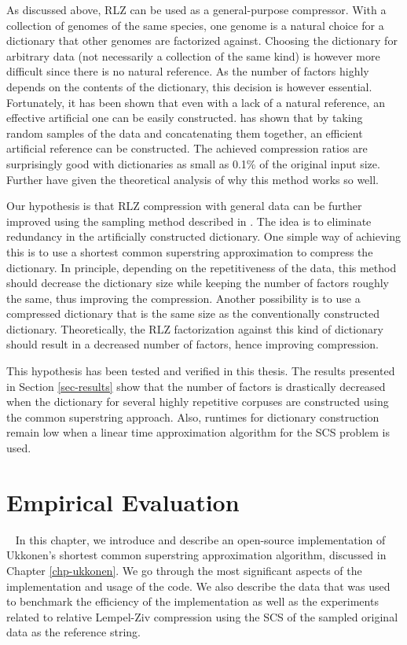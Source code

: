 \documentclass[english,twoside,censored,csm,algorithms-track-2020]{HYthesisML}
\theoremstyle{plain}
\theoremstyle{definition}
\begin{document}
As discussed above, RLZ can be used as a general-purpose compressor. With a collection of
genomes of the same species, one genome is a natural choice for a dictionary that other genomes are
factorized against. Choosing the dictionary for arbitrary data (not necessarily a collection of the
same kind) is however more difficult since there is no natural reference. As the number of factors
highly depends on the contents of the dictionary, this decision is however essential. Fortunately, it has been shown
that even with a lack of a natural reference, an effective artificial one can be easily constructed.
\citep{Hoobin11} has shown that by taking random samples of the data and concatenating them together,
an efficient  artificial reference can be constructed. The achieved compression ratios are surprisingly
good with dictionaries as small as 0.1\% of the original input size. Further \citep{Gagie16} have
given the theoretical analysis of why this method works so well.

Our hypothesis is that RLZ compression with general data can be further improved using the
sampling method described in \citep{Hoobin11}. The idea is to eliminate redundancy in the
artificially constructed dictionary. One simple way of achieving this is to use a shortest common
superstring approximation to compress the dictionary. In principle, depending on the repetitiveness
of the data, this method should decrease the dictionary size while keeping the number of factors
roughly the same, thus improving the compression. Another possibility is to use a compressed
dictionary that is the same size as the conventionally constructed dictionary. Theoretically, the
RLZ factorization against this kind of dictionary should result in a decreased number of factors,
hence improving compression.

This hypothesis has been tested and verified in this thesis. The results presented in Section
\ref{sec-results} show that the number of factors is drastically decreased when the dictionary
for several highly repetitive corpuses are constructed using the common superstring approach.
Also, runtimes for dictionary construction remain low when a linear time approximation
algorithm for the SCS problem is used.

\chapter{Empirical Evaluation}~\label{chp-results}
In this chapter, we introduce and describe an open-source implementation of Ukkonen's shortest
common superstring
approximation algorithm, discussed in Chapter \ref{chp-ukkonen}. We go through the most significant
aspects of the implementation and usage of the code. We also describe the data that was used to
benchmark the efficiency of the implementation as well as the experiments related to
relative Lempel-Ziv compression using the SCS of the sampled original data as the reference string.
\end{document}

